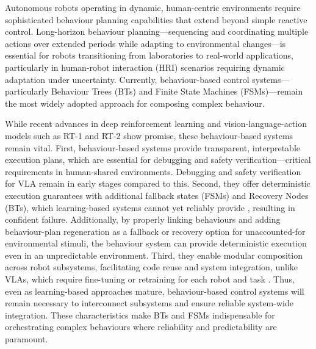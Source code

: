 \documentclass[letterpaper, 10pt, conference]{ieeeconf}      %
\begin{document}

Autonomous robots operating in dynamic, human-centric environments require sophisticated behaviour planning capabilities that extend beyond simple reactive control. Long-horizon behaviour planning—sequencing and coordinating multiple actions over extended periods while adapting to environmental changes—is essential for robots transitioning from laboratories to real-world applications, particularly in human-robot interaction (HRI) scenarios requiring dynamic adaptation under uncertainty. Currently, behaviour-based control systems—particularly Behaviour Trees (BTs) and Finite State Machines (FSMs)—remain the most widely adopted approach for composing complex behaviour.

While recent advances in deep reinforcement learning \cite{chen_crowd-robot_2019, liu_decentralized_2021} and vision-language-action models such as RT-1 \cite{brohan_rt-1_2023} and RT-2 \cite{brohan_rt-2_2023} show promise, these behaviour-based systems remain vital. First, behaviour-based systems provide transparent, interpretable execution plans, which are essential for debugging and safety verification—critical requirements in human-shared environments. Debugging and safety verification \cite{zhang25safevla} for VLA remain in early stages compared to this. Second, they offer deterministic execution guarantees with additional fallback states (FSMs) and Recovery Nodes (BTs), which learning-based systems cannot yet reliably provide \cite{neary2025}, resulting in confident failure. Additionally, by properly linking behaviours and adding behaviour-plan regeneration as a fallback or recovery option for unaccounted-for environmental stimuli, the behaviour system can provide deterministic execution even in an unpredictable environment. Third, they enable modular composition across robot subsystems, facilitating code reuse and system integration, unlike VLAs, which require fine-tuning or retraining for each robot and task \cite{neary2025}. Thus, even as learning-based approaches mature, behaviour-based control systems will remain necessary to interconnect subsystems and ensure reliable system-wide integration. These characteristics make BTs and FSMs indispensable for orchestrating complex behaviours where reliability and predictability are paramount.
\end{document}

